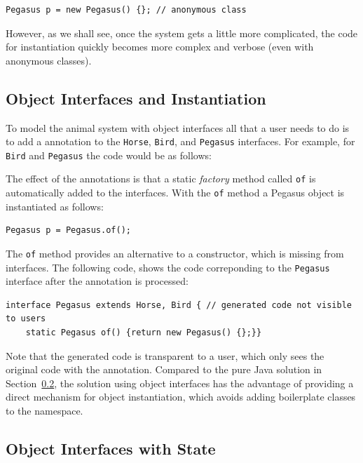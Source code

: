 \begin{lstlisting}
Pegasus p = new Pegasus() {}; // anonymous class
\end{lstlisting}

\noindent However, as we shall see, once the system gets a little more
complicated, the code for instantiation quickly becomes more 
complex and verbose (even with anonymous classes). 

\subsection{Object Interfaces and Instantiation} 

To model the animal system with object interfaces all that a user
needs to do is to add a \mixin annotation to the \texttt{Horse}, 
\texttt{Bird}, and \texttt{Pegasus} interfaces.  For example, 
for \texttt{Bird} and \texttt{Pegasus} the code would be as follows: 


The effect of the annotations is that a static \emph{factory} method called
\texttt{of} is automatically added to the interfaces. With the
\texttt{of} method a Pegasus object is instantiated as follows:

\begin{lstlisting}
Pegasus p = Pegasus.of();
\end{lstlisting}

\noindent The \texttt{of} method provides an alternative to a
constructor, which is missing from interfaces. The following code,
shows the code correponding to the \texttt{Pegasus} interface
after the \mixin annotation is processed:

\begin{lstlisting}
interface Pegasus extends Horse, Bird { // generated code not visible to users
	static Pegasus of() {return new Pegasus() {};}}
\end{lstlisting}

\noindent Note that the generated code is transparent to a user, which
only sees the original code with the \mixin annotation. Compared to the pure
Java solution in Section~\ref{}, the solution using object interfaces
has the advantage of providing a direct mechanism for object
instantiation, which avoids adding boilerplate classes to the
namespace. 

\subsection{Object Interfaces with State}

